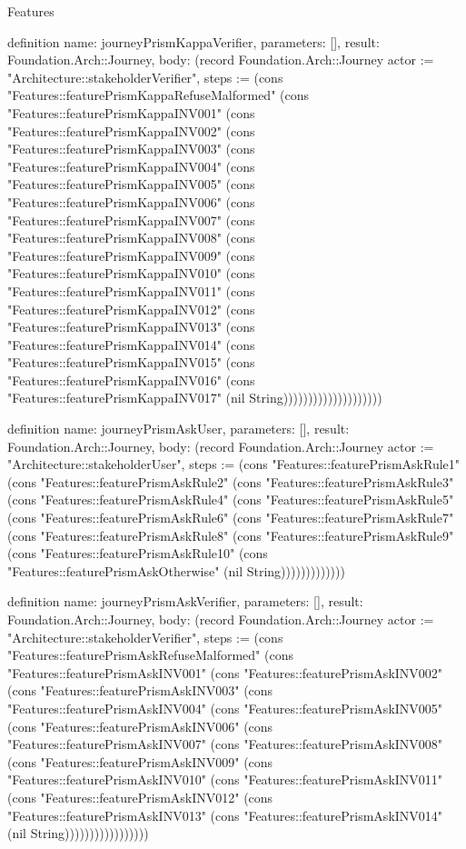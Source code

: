 \begin{lexlean}{Features}
\begin{semanticmodule}
definition{
  name: journeyPrismKappaVerifier,
  parameters: [],
  result: Foundation.Arch::Journey,
  body: (record Foundation.Arch::Journey {actor := "Architecture::stakeholderVerifier", steps := (cons "Features::featurePrismKappaRefuseMalformed" (cons "Features::featurePrismKappaINV001" (cons "Features::featurePrismKappaINV002" (cons "Features::featurePrismKappaINV003" (cons "Features::featurePrismKappaINV004" (cons "Features::featurePrismKappaINV005" (cons "Features::featurePrismKappaINV006" (cons "Features::featurePrismKappaINV007" (cons "Features::featurePrismKappaINV008" (cons "Features::featurePrismKappaINV009" (cons "Features::featurePrismKappaINV010" (cons "Features::featurePrismKappaINV011" (cons "Features::featurePrismKappaINV012" (cons "Features::featurePrismKappaINV013" (cons "Features::featurePrismKappaINV014" (cons "Features::featurePrismKappaINV015" (cons "Features::featurePrismKappaINV016" (cons "Features::featurePrismKappaINV017" (nil String)))))))))))))))))))})
}

definition{
  name: journeyPrismAskUser,
  parameters: [],
  result: Foundation.Arch::Journey,
  body: (record Foundation.Arch::Journey {actor := "Architecture::stakeholderUser", steps := (cons "Features::featurePrismAskRule1" (cons "Features::featurePrismAskRule2" (cons "Features::featurePrismAskRule3" (cons "Features::featurePrismAskRule4" (cons "Features::featurePrismAskRule5" (cons "Features::featurePrismAskRule6" (cons "Features::featurePrismAskRule7" (cons "Features::featurePrismAskRule8" (cons "Features::featurePrismAskRule9" (cons "Features::featurePrismAskRule10" (cons "Features::featurePrismAskOtherwise" (nil String))))))))))))})
}

definition{
  name: journeyPrismAskVerifier,
  parameters: [],
  result: Foundation.Arch::Journey,
  body: (record Foundation.Arch::Journey {actor := "Architecture::stakeholderVerifier", steps := (cons "Features::featurePrismAskRefuseMalformed" (cons "Features::featurePrismAskINV001" (cons "Features::featurePrismAskINV002" (cons "Features::featurePrismAskINV003" (cons "Features::featurePrismAskINV004" (cons "Features::featurePrismAskINV005" (cons "Features::featurePrismAskINV006" (cons "Features::featurePrismAskINV007" (cons "Features::featurePrismAskINV008" (cons "Features::featurePrismAskINV009" (cons "Features::featurePrismAskINV010" (cons "Features::featurePrismAskINV011" (cons "Features::featurePrismAskINV012" (cons "Features::featurePrismAskINV013" (cons "Features::featurePrismAskINV014" (nil String))))))))))))))))})
}
\end{semanticmodule}
\end{lexlean}
